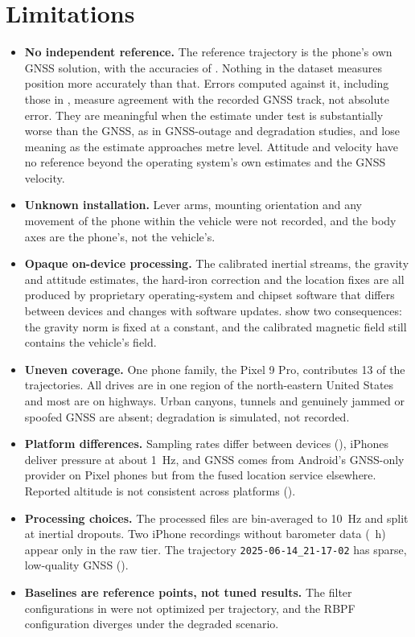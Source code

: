 \section{Limitations}
\label{sec:limitations}

\begin{itemize}
\item \textbf{No independent reference.} The reference trajectory is the phone's own GNSS solution, with the accuracies of . Nothing in the dataset measures position more accurately than that. Errors computed against it, including those in , measure agreement with the recorded GNSS track, not absolute error. They are meaningful when the estimate under test is substantially worse than the GNSS, as in GNSS-outage and degradation studies, and lose meaning as the estimate approaches metre level. Attitude and velocity have no reference beyond the operating system's own estimates and the GNSS velocity.
\item \textbf{Unknown installation.}  Lever arms, mounting orientation and any movement of the phone within the vehicle were not recorded, and the body axes are the phone's, not the vehicle's.
\item \textbf{Opaque on-device processing.} The calibrated inertial streams, the gravity and attitude estimates, the hard-iron correction and the location fixes are all produced by proprietary operating-system and chipset software that differs between devices and changes with software updates.  show two consequences: the gravity norm is fixed at a constant, and the calibrated magnetic field still contains the vehicle's field.
\item \textbf{Uneven coverage.} One phone family, the Pixel 9 Pro, contributes 13 of the \numTrajectories{} trajectories. All drives are in one region of the north-eastern United States and most are on highways. Urban canyons, tunnels and genuinely jammed or spoofed GNSS are absent; degradation is simulated, not recorded.
\item \textbf{Platform differences.} Sampling rates differ between devices (), iPhones deliver pressure at about 1~Hz, and GNSS comes from Android's GNSS-only provider on Pixel phones but from the fused location service elsewhere. Reported altitude is not consistent across platforms ().
\item \textbf{Processing choices.} The processed files are bin-averaged to 10~Hz and split at inertial dropouts. Two iPhone recordings without barometer data (\numNoBaroHours~h) appear only in the raw tier. The trajectory \texttt{2025-06-14\_21-17-02} has sparse, low-quality GNSS ().
\item \textbf{Baselines are reference points, not tuned results.} The filter configurations in  were not optimized per trajectory, and the RBPF configuration diverges under the degraded scenario.
\end{itemize}

